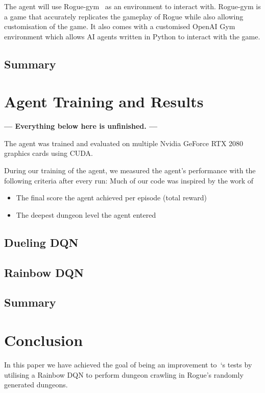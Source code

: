 \documentclass[12pt,a4paper]{article}
\begin{document}
    The agent will use Rogue-gym~\citep{kanagawa19} as an environment to interact with.
    Rogue-gym is a game that accurately replicates the gameplay of Rogue while also allowing customisation of the game.
    It also comes with a customised OpenAI Gym environment which allows AI agents written in Python to interact with the game.

    \subsection{Summary}\label{subsec:summary2} %

    \section{Agent Training and Results}\label{sec:agent-training-and-results}  %
    \textbf{--- Everything below here is unfinished. ---}

    The agent was trained and evaluated on multiple Nvidia GeForce RTX 2080 graphics cards using CUDA.

    During our training of the agent, we measured the agent's performance with the following criteria after every run:
    Much of our code was inspired by the work of~\citet{sebtheiler}
    \begin{itemize}
        \item The final score the agent achieved per episode (total reward)
        \item The deepest dungeon level the agent entered
    \end{itemize}

    \subsection{Dueling DQN}\label{subsec:dueling-dqn}

    \subsection{Rainbow DQN}\label{subsec:rainbow-dqn}

    \subsection{Summary}\label{subsec:summary}

    \section{Conclusion}\label{sec:conclusion}
    In this paper we have achieved the goal of being an improvement to~\citet{asperti18}`s tests by utilising a Rainbow
    DQN to perform dungeon crawling in Rogue's randomly generated dungeons.
\end{document}
